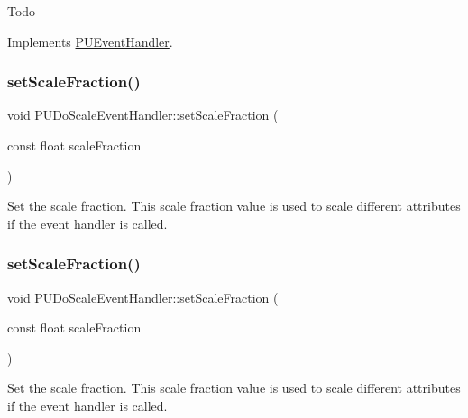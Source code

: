 Todo 

Implements \hyperlink{classPUEventHandler_a760172609708c65548dcac364c9b3b9c}{P\+U\+Event\+Handler}.

\mbox{\label{classPUDoScaleEventHandler_a78a674ef94c1e27dfb44d858ab7355bf}} 
\subsubsection{\texorpdfstring{set\+Scale\+Fraction()}{setScaleFraction()}\hspace{0.1cm}{\footnotesize\ttfamily [1/2]}}
{\footnotesize\ttfamily void P\+U\+Do\+Scale\+Event\+Handler\+::set\+Scale\+Fraction (\begin{DoxyParamCaption}\item[{const float}]{scale\+Fraction }\end{DoxyParamCaption})}

Set the scale fraction. This scale fraction value is used to scale different attributes if the event handler is called. \mbox{\label{classPUDoScaleEventHandler_a78a674ef94c1e27dfb44d858ab7355bf}} 
\subsubsection{\texorpdfstring{set\+Scale\+Fraction()}{setScaleFraction()}\hspace{0.1cm}{\footnotesize\ttfamily [2/2]}}
{\footnotesize\ttfamily void P\+U\+Do\+Scale\+Event\+Handler\+::set\+Scale\+Fraction (\begin{DoxyParamCaption}\item[{const float}]{scale\+Fraction }\end{DoxyParamCaption})}

Set the scale fraction. This scale fraction value is used to scale different attributes if the event handler is called. \mbox{\label{classPUDoScaleEventHandler_a6e53868333c76e91eb38d608bc2e06b9}} 
